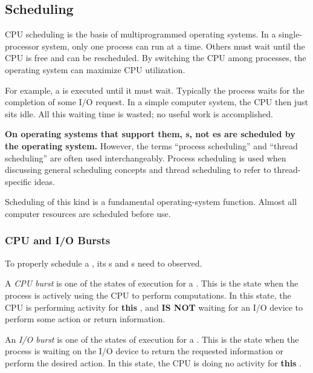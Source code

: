 \subsection{Scheduling}\label{subsec:Scheduling}
CPU scheduling is the basis of multiprogrammed operating systems.
In a single-processor system, only one process can run at a time.
Others must wait until the CPU is free and can be rescheduled.
By switching the CPU among processes, the operating system can maximize CPU utilization.

For example, a  is executed until it must wait.
Typically the process waits for the completion of some I/O request.
In a simple computer system, the CPU then just sits idle.
All this waiting time is wasted; no useful work is accomplished.

\begin{blackbox}
  \textbf{On operating systems that support them, s, not es are scheduled by the operating system.}
  However, the terms ``process scheduling'' and ``thread scheduling'' are often used interchangeably.
  Process scheduling is used when discussing general scheduling concepts and thread scheduling to refer to thread-specific ideas.
\end{blackbox}

Scheduling of this kind is a fundamental operating-system function.
Almost all computer resources are scheduled before use.

\subsubsection{CPU and I/O Bursts}\label{subsubsec:CPU_IO_Bursts}
To properly schedule a , its s and s need to observed.

\begin{definition}\label{def:CPU_Burst}
  A \emph{CPU burst} is one of the states of execution for a .
  This is the state when the process is actively using the CPU to perform computations.
  In this state, the CPU is performing activity for \textbf{this} , and \textbf{IS NOT} waiting for an I/O device to perform some action or return information.
\end{definition}

\begin{definition}[I/O Burst]\label{def:I/O_Burst}
  An \emph{I/O burst} is one of the states of execution for a .
  This is the state when the process is waiting on the I/O device to return the requested information or perform the desired action.
  In this state, the CPU is doing no activity for \textbf{this} .
\end{definition}

